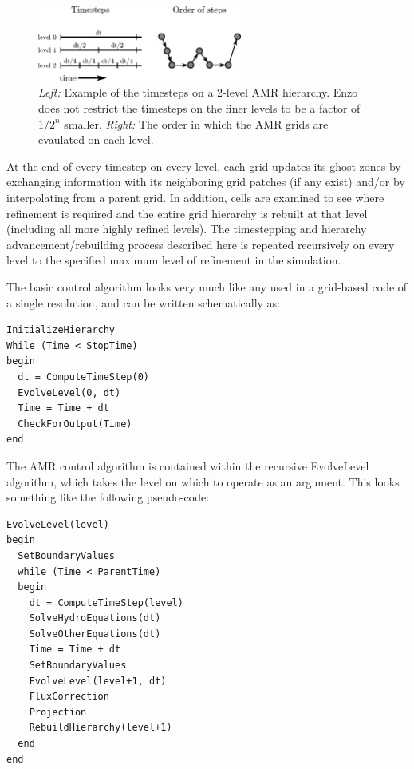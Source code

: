 \begin{figure}
\begin{center}
\includegraphics[width=0.6\textwidth]{figures/timestepping.eps}
\end{center}
\caption{\emph{Left:} Example of the timesteps on a 2-level AMR
  hierarchy.  Enzo does not restrict the timesteps on the finer levels
  to be a factor of $1/2^n$ smaller.  \emph{Right:} The order in which
  the AMR grids are evaulated on each level.}
\label{fig:wcycle}
\end{figure}

At the end of every timestep on every level, each grid updates its ghost zones by exchanging information with its neighboring grid patches (if any exist) and/or by interpolating from a parent grid.  In addition, cells are examined to see where refinement is required and the entire grid hierarchy is rebuilt at that level (including all more highly refined levels).  The timestepping and hierarchy advancement/rebuilding process described here is repeated recursively on every level to the specified maximum level of refinement in the simulation. 

The basic control algorithm looks very much like any used in a grid-based code of a single resolution, and can be written schematically as:
\begin{verbatim}
InitializeHierarchy
While (Time < StopTime)
begin
  dt = ComputeTimeStep(0)
  EvolveLevel(0, dt)
  Time = Time + dt
  CheckForOutput(Time)
end
\end{verbatim}
The AMR control algorithm is contained within the recursive
EvolveLevel algorithm, which takes the level on which to operate as an
argument.  This looks something like the following pseudo-code:
\begin{verbatim}
EvolveLevel(level)
begin
  SetBoundaryValues
  while (Time < ParentTime)
  begin
    dt = ComputeTimeStep(level)
    SolveHydroEquations(dt)
    SolveOtherEquations(dt)
    Time = Time + dt
    SetBoundaryValues
    EvolveLevel(level+1, dt)
    FluxCorrection
    Projection
    RebuildHierarchy(level+1)
  end
end
\end{verbatim}

